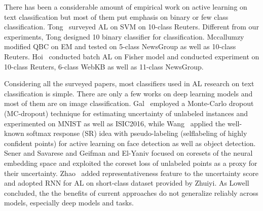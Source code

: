 There has been a considerable amount of empirical work on active learning on text classification but most of them put emphasis on binary or few class classification. Tong~ surveyed AL on SVM on 10-class Reuters. Different from our experiments, Tong designed 10 binary classifier for classification. Mccallumzy~ modified QBC on EM and tested on 5-class NewsGroup as well as 10-class Reuters. Hoi~ conducted batch AL on Fisher model and conducted experiment on 10-class Reuters, 6-class WebKB as well as 11-class NewsGroup.

Considering all the surveyed papers, most classifiers used in AL research 
on text classification is simple. There are only a few works on 
deep learning models and most of them are on image classification. 
Gal~ employed a Monte-Carlo dropout 
(MC-dropout) technique for estimating uncertainty of unlabeled instances 
and experimented on MNIST as well as ISIC2016, while 
Wang~ applied the well-known softmax response 
(SR) idea with pseudo-labeling (selflabeling of highly confident points) 
for active learning on face detection as well as object detection. 
Sener and Savarese \cite{sener2017active}  and Geifman and 
El-Yaniv \cite{geifman2017deep}  focused on coresets of the neural embedding 
space and exploited the coreset loss of unlabeled points as a proxy 
for their uncertainty. Zhao~ added representativeness 
feature to the uncertainty score and adopted RNN for AL on short-class dataset provided by Zhuiyi. As Lowell ~ concluded, the the benefits of current approaches do not generalize reliably across models, especially deep models and tasks.
